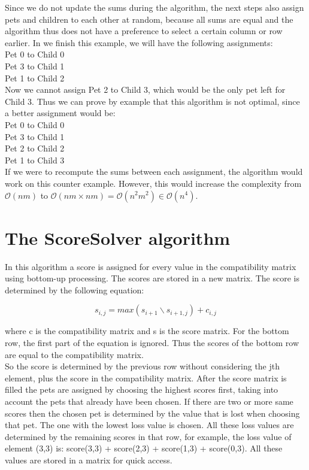 \documentclass[paper=a4, fontsize=11pt]{scrartcl} %
\numberwithin{equation}{section} %
\numberwithin{figure}{section} %
\numberwithin{table}{section} %
\begin{document}
Since we do not update the sums during the algorithm, the next steps also assign pets and children to each other at random, because all sums are equal and the algorithm thus does not have a preference to select a certain column or row earlier.
In we finish this example, we will have the following assignments:\\

Pet 0 to Child 0\\
Pet 3 to Child 1\\
Pet 1 to Child 2\\

Now we cannot assign Pet 2 to Child 3, which would be the only pet left for Child 3. Thus we can prove by example that this algorithm is not optimal, since a better assignment would be:\\

Pet 0 to Child 0\\
Pet 3 to Child 1\\
Pet 2 to Child 2\\
Pet 1 to Child 3\\

If we were to recompute the sums between each assignment, the algorithm would work on this counter example.
However, this would increase the complexity from $\mathcal{O}(nm)$ to $\mathcal{O}(nm \times nm) = \mathcal{O}(n^2m^2) \in \mathcal{O}(n^4)$.

\section{The ScoreSolver algorithm}
In this algorithm a score is assigned for every value in the compatibility matrix using bottom-up processing.
The scores are stored in a new matrix.
The score is determined by the following equation:

\begin{equation}
	s_{i,j} = max(s_{i+1} \backslash s_{i+1,j}) + c_{i,j}
	\label{eq}
\end{equation}

where c is the compatibility matrix and s is the score matrix. For the bottom row, the first part of the equation is ignored. Thus the scores of the bottom row are equal to the compatibility matrix.\\

So the score is determined by the previous row without considering the jth element, plus the score in the compatibility matrix.
After the score matrix is filled the pets are assigned by choosing the highest scores first, taking into account the pets that already have been chosen.
If there are two or more same scores then the chosen pet is determined by the value that is lost when choosing that pet.
The one with the lowest loss value is chosen.
All these loss values are determined by the remaining scores in that row, for example, the loss value of element (3,3) is: score(3,3) + score(2,3) + score(1,3) + score(0,3).
All these values are stored in a matrix for quick access.
\end{document}
